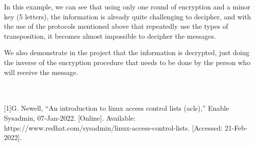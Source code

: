 \documentclass[twoside,twocolumn]{article}
\begin{document}
In this example, we can see that using only one round of encryption and a minor key (5 letters), the information is already quite challenging to decipher, and with the use of the protocols mentioned above that repeatedly use the types of transposition, it becomes almost impossible to decipher the messages.

We also demonstrate in the project that the information is decrypted, just doing the inverse of the encryption procedure that needs to be done by the person who will receive the message. \\ \\ \\

\begin{thebibliography}{} %
\footnotesize[1]G. Newell, “An introduction to linux access control lists (acls),” Enable Sysadmin, 07-Jan-2022. [Online]. Available: https://www.redhat.com/sysadmin/linux-access-control-lists. [Accessed: 21-Feb-2022]. \\ \\
 
\end{thebibliography}


\end{document}
